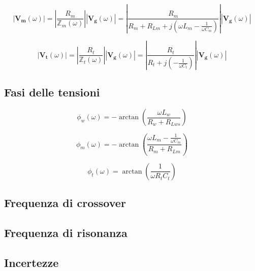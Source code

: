 \documentclass[12pt,italian]{article}
\begin{document}
\begin{equation}
  \left| \mathbf{V_{m}}(\omega) \right| = \left| \frac{R_{m}}
  {\mathbb{Z}_{m}(\omega)}\right|\left| \mathbf{V_{g}}(\omega) \right| = \left| \frac{R_{m}}{R_{m}+R_{Lm} + j (\omega L_m - \frac{1}{\omega C_{m}})} \right| \left| \mathbf{V_{g}}(\omega) \right|
\end{equation}

\begin{equation}
  \left| \mathbf{V_{t}}(\omega) \right| = \left| \frac{R_{t}}
  {\mathbb{Z}_{t}(\omega)}\right|\left| \mathbf{V_{g}}(\omega) \right| = \left| \frac{R_{t}}{R_{t} + j (-\frac{1}{\omega C_{t}})}\right|\left| \mathbf{V_{g}}(\omega) \right|
\end{equation}

\subsection{Fasi delle tensioni}
\label{sec:fasi}

\begin{equation}
  \phi_{w}(\omega) = - \arctan\left(\frac{\omega L_{w}}{R_{w}+R_{Lws}}\right)
\end{equation}

\begin{equation}
  \phi_{m}(\omega) = - \arctan\left(\frac{\omega L_{m} - \frac{1}{\omega C_{m}}}{R_{m}+R_{Lm}}\right)
\end{equation}

\begin{equation}
  \phi_{t}(\omega) = \arctan\left(\frac{1}{\omega R_{t} C_{t}}\right)
\end{equation}

\subsection{Frequenza di crossover}
\label{sec:crossFreq}

\subsection{Frequenza di risonanza}
\label{sec:resFreq}

\subsection{Incertezze}
\end{document}
